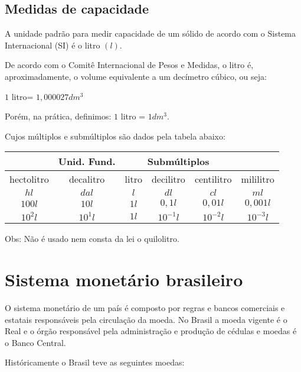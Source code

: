 \subsection{Medidas de capacidade}
A unidade padrão para medir capacidade de um sólido de acordo com o Sistema Internacional (SI) é o litro $(l)$.

De acordo com o Comitê Internacional de Pesos e Medidas, o litro é, aproximadamente, o volume equivalente a um decímetro cúbico, ou seja:

$1$ litro= $1,000027 dm^3$

Porém, na prática, definimos:
$1$ litro = $1 dm^3$.

Cujos múltiplos e submúltiplos são dados pela tabela abaixo:

 \begin{table}[H]
 \centering
 \begin{tabular}{|c|c|c|c|c|c|} \hline
 \rowcolor{cinza}
  \multicolumn{2}{|c|}{\textbf{Múltiplos}}
 & \multicolumn{1}{|c|}{\textbf{Unid. Fund.}} & \multicolumn{3}{|c|}{\textbf{Submúltiplos}} \\
 \hline
 hectolitro & decalitro & litro & decilitro & centilitro & mililitro \\
 \hline
 $hl$ & $dal$ & $l$ & $dl$ & $cl$ & $ml$ \\ \hline
 $100 l$ & $10 l$ & $1 l$ & $0,1 l$ & $0,01 l$ & $0,001 l$\\ \hline
 $10^2 l$ & $10^1 l$ & $1 l$ & $10^{-1} l$ & $10^{-2} l$ & $10^{-3} l$\\ \hline
 \end{tabular}
\end{table}

Obs: Não é usado nem consta da lei o quilolitro.



\section{Sistema monetário brasileiro}
O sistema monetário de um país é composto por regras e bancos comerciais e estatais responsáveis pela circulação da moeda. No Brasil a moeda vigente é o Real e o órgão responsável pela administração e produção de cédulas e moedas é o Banco Central.

Históricamente o Brasil teve as seguintes moedas:

